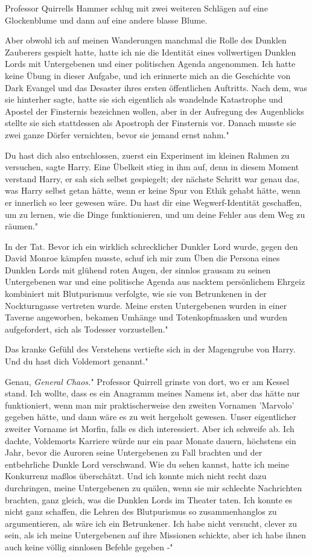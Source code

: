 Professor Quirrells Hammer schlug mit zwei weiteren Schlägen auf eine
Glockenblume und dann auf eine andere blasse Blume.

\glqq Aber obwohl ich auf meinen Wanderungen manchmal die Rolle des Dunklen
Zauberers gespielt hatte, hatte ich nie die Identität eines vollwertigen Dunklen
Lords mit Untergebenen und einer politischen Agenda angenommen. Ich hatte keine
Übung in dieser Aufgabe, und ich erinnerte mich an die Geschichte von Dark
Evangel und das Desaster ihres ersten öffentlichen Auftritts. Nach dem, was sie
hinterher sagte, hatte sie sich eigentlich als wandelnde Katastrophe und Apostel
der Finsternis bezeichnen wollen, aber in der Aufregung des Augenblicks stellte
sie sich stattdessen als Apostroph der Finsternis vor. Danach musste sie zwei
ganze Dörfer vernichten, bevor sie jemand ernst nahm."

\glqq Du hast dich also entschlossen, zuerst ein Experiment im kleinen Rahmen zu
versuchen\grqq{}, sagte Harry. Eine Übelkeit stieg in ihm auf, denn in diesem
Moment verstand Harry, er sah sich selbst gespiegelt; der nächste Schritt war
genau das, was Harry selbst getan hätte, wenn er keine Spur von Ethik gehabt
hätte, wenn er innerlich so leer gewesen wäre. \glqq Du hast dir eine
Wegwerf-Identität geschaffen, um zu lernen, wie die Dinge funktionieren, und um
deine Fehler aus dem Weg zu räumen."

\glqq In der Tat. Bevor ich ein wirklich schrecklicher Dunkler Lord wurde, gegen
den David Monroe kämpfen musste, schuf ich mir zum Üben die Persona eines
Dunklen Lords mit glühend roten Augen, der sinnlos grausam zu seinen
Untergebenen war und eine politische Agenda aus nacktem persönlichem Ehrgeiz
kombiniert mit Blutpurismus verfolgte, wie sie von Betrunkenen in der
Nockturngasse vertreten wurde. Meine ersten Untergebenen wurden in einer Taverne
angeworben, bekamen Umhänge und Totenkopfmasken und wurden aufgefordert, sich
als Todesser vorzustellen."

Das kranke Gefühl des Verstehens vertiefte sich in der Magengrube von Harry.
\glqq Und du hast dich Voldemort genannt."

\glqq Genau, \emph{General Chaos.}" Professor Quirrell grinste von dort, wo er
am Kessel stand. \glqq Ich wollte, dass es ein Anagramm meines Namens ist, aber
das hätte nur funktioniert, wenn man mir praktischerweise den zweiten Vornamen
'Marvolo' gegeben hätte, und dann wäre es zu weit hergeholt gewesen. Unser
eigentlicher zweiter Vorname ist Morfin, falls es dich interessiert. Aber ich
schweife ab. Ich dachte, Voldemorts Karriere würde nur ein paar Monate dauern,
höchstens ein Jahr, bevor die Auroren seine Untergebenen zu Fall brachten und
der entbehrliche Dunkle Lord verschwand. Wie du sehen kannst, hatte ich meine
Konkurrenz maßlos überschätzt. Und ich konnte mich nicht recht dazu durchringen,
meine Untergebenen zu quälen, wenn sie mir schlechte Nachrichten brachten, ganz
gleich, was die Dunklen Lords im Theater taten. Ich konnte es nicht ganz
schaffen, die Lehren des Blutpurismus so zusammenhanglos zu argumentieren, als
wäre ich ein Betrunkener. Ich habe nicht versucht, clever zu sein, als ich meine
Untergebenen auf ihre Missionen schickte, aber ich habe ihnen auch keine völlig
sinnlosen Befehle gegeben -"

